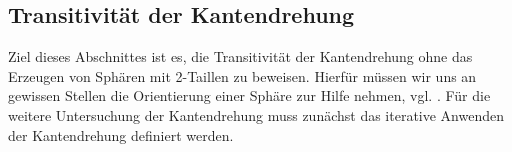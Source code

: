 \documentclass[12pt,titlepage,twoside,cleardoublepage]{article}
\theoremstyle{nummermitklammern}
\newtheorem{definition}[temp]{Definition}
\newtheorem{definition}[zahl]{Definition}
\numberwithin{equation}{section}
\begin{document}
 \subsection{Transitivität der Kantendrehung}

Ziel dieses Abschnittes ist es, die Transitivität der Kantendrehung ohne das Erzeugen von Sphären mit 2-Taillen zu beweisen. Hierfür müssen wir uns an gewissen Stellen die Orientierung einer Sphäre zur Hilfe nehmen, vgl. \cite{simp}. 
Für die weitere Untersuchung der Kantendrehung muss zunächst das iterative Anwenden der Kantendrehung definiert werden.
\end{document}
